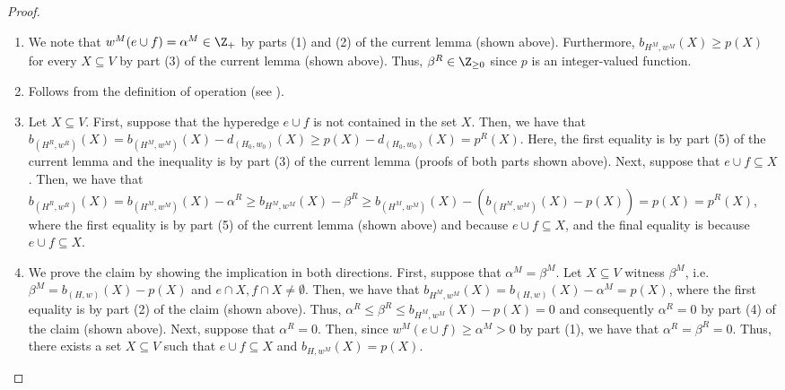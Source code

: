 \begin{proof}
\begin{enumerate}
    \item We note that $w^M(e\cup f) = \alpha^M \in \Z_+$ by parts (1) and (2) of the current lemma (shown above). Furthermore, $b_{H^M,w^M}(X) \geq p(X)$ for every $X\subseteq V$ by part (3) of the current lemma (shown above). Thus, $\beta^R \in \Z_{\geq 0}$ since $p$ is an integer-valued function.

    \item Follows from the definition of \reduce operation (see ).

    \item Let $X\subseteq V$. First, suppose that the hyperedge $e\cup f$ is not contained in the set $X$. 
    Then, we have that $b_{(H^R, w^R)}(X) = b_{(H^M, w^M)}(X) - d_{(H_0, w_0)}(X) \geq p(X) - d_{(H_0, w_0)}(X) = p^R(X)$. Here, the first equality is by part (5) of the current lemma and the inequality is by part (3) of the current lemma (proofs of both parts shown above).  Next, suppose that $e\cup f \subseteq X$. Then, we have that $b_{(H^R, w^R)}(X) = b_{(H^M, w^M)}(X) - \alpha^R \geq b_{H^M,w^M}(X) - \beta^R \geq b_{(H^M, w^M)}(X) - (b_{(H^M, w^M)}(X) - p(X)) = p(X) = p^R(X)$, where the first equality is by part (5) of the current lemma (shown above) and because $e\cup f \subseteq X$, and the final equality is because $e\cup f \subseteq X$.
\iffalse
    \item We prove the claim by showing the implication in both directions.
    First, suppose that $\alpha^M = \beta^M$. Let $X \subseteq V$ witness $\beta^M$, i.e. $\beta^M = b_{(H,w)}(X) - p(X)$ and $e\cap X, f\cap X \not = \emptyset$. Then, we have that
    $b_{H^M,w^M}(X) = b_{(H,w)}(X) - \alpha^M = p(X)$, where the first equality is by part (2) of the claim (shown above). Thus, $\alpha^R \leq \beta^R \leq b_{H^M,w^M}(X) - p(X) = 0$  and consequently $\alpha^R = 0$ by part (4) of the claim (shown above). Next, suppose that $\alpha^R = 0$. Then, since $w^M(e\cup f) \geq \alpha^M > 0$ by part (1), we have that $\alpha^R = \beta^R = 0$. Thus, there exists a set $X \subseteq V$ such that $e\cup f \subseteq X$ and $b_{H,w^M}(X) = p(X)$. 

\end{enumerate}
\end{proof}
